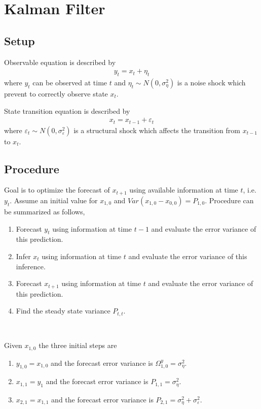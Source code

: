 \documentclass[14pt]{article}
\begin{document}
\section*{Kalman Filter}

\subsection*{Setup}

Observable equation is described by
\begin{eqnarray}
y_t = x_t + \eta_t
\end{eqnarray}
where $y_t$ can be observed at time $t$ and $\eta_t \sim N(0,\sigma^2_{\eta})$ is a noise shock which prevent to correctly observe state $x_t$.


State transition equation is described by
\begin{eqnarray}
x_{t} = x_{t-1} + \varepsilon_t
\end{eqnarray}
where $\varepsilon_t \sim N(0,\sigma^2_{\varepsilon})$ is a structural shock which affects the transition from $x_{t-1}$ to $x_t$.

\subsection*{Procedure}

Goal is to optimize the forecast of $x_{t+1}$ using available information at time $t$, i.e. $y_t$. Assume an initial value for $x_{1,0}$ and $Var(x_{1,0} - x_{0,0}) = P_{1,0}$. Procedure can be summarized as follows,
\begin{enumerate}
	\item Forecast $y_t$ using information at time $t-1$ and evaluate the error variance of this prediction.
	\item Infer $x_t$ using information at time $t$ and evaluate the error variance of this inference.
	\item Forecast $x_{t+1}$ using information at time $t$ and evaluate the error variance of this prediction.
	\item Find the steady state variance $P_{t,t}$.
\end{enumerate}

\

Given $x_{1,0}$ the three initial steps are
\begin{enumerate}
	\item $y_{1,0} =  x_{1,0}$ and the forecast error variance is $\Omega^y_{1,0} =\sigma^2_{\eta}$.
	\item $x_{1,1} =  y_1$ and the forecast error variance is $P_{1,1} = \sigma^2_{\eta}$.
	\item $x_{2,1} = x_{1,1}$ and the forecast error variance is $P_{2,1} = \sigma^2_{\eta} + \sigma^2_{\varepsilon}$.
\end{enumerate}
\end{document}
